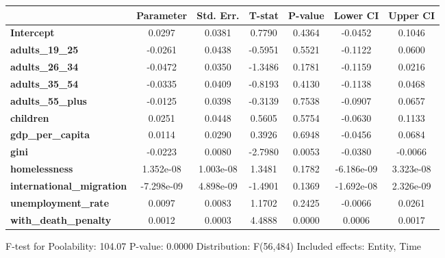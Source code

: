\begin{center}
\begin{tabular}{lclc}
\bottomrule
\end{tabular}
\begin{tabular}{lcccccc}
                                  & \textbf{Parameter} & \textbf{Std. Err.} & \textbf{T-stat} & \textbf{P-value} & \textbf{Lower CI} & \textbf{Upper CI}  \\
\midrule
\textbf{Intercept}                &       0.0297       &       0.0381       &      0.7790     &      0.4364      &      -0.0452      &       0.1046       \\
\textbf{adults\_19\_25}           &      -0.0261       &       0.0438       &     -0.5951     &      0.5521      &      -0.1122      &       0.0600       \\
\textbf{adults\_26\_34}           &      -0.0472       &       0.0350       &     -1.3486     &      0.1781      &      -0.1159      &       0.0216       \\
\textbf{adults\_35\_54}           &      -0.0335       &       0.0409       &     -0.8193     &      0.4130      &      -0.1138      &       0.0468       \\
\textbf{adults\_55\_plus}         &      -0.0125       &       0.0398       &     -0.3139     &      0.7538      &      -0.0907      &       0.0657       \\
\textbf{children}                 &       0.0251       &       0.0448       &      0.5605     &      0.5754      &      -0.0630      &       0.1133       \\
\textbf{gdp\_per\_capita}         &       0.0114       &       0.0290       &      0.3926     &      0.6948      &      -0.0456      &       0.0684       \\
\textbf{gini}                     &      -0.0223       &       0.0080       &     -2.7980     &      0.0053      &      -0.0380      &      -0.0066       \\
\textbf{homelessness}             &     1.352e-08      &     1.003e-08      &      1.3481     &      0.1782      &     -6.186e-09    &     3.323e-08      \\
\textbf{international\_migration} &     -7.298e-09     &     4.898e-09      &     -1.4901     &      0.1369      &     -1.692e-08    &     2.326e-09      \\
\textbf{unemployment\_rate}       &       0.0097       &       0.0083       &      1.1702     &      0.2425      &      -0.0066      &       0.0261       \\
\textbf{with\_death\_penalty}     &       0.0012       &       0.0003       &      4.4888     &      0.0000      &       0.0006      &       0.0017       \\
\bottomrule
\end{tabular}
\end{center}

F-test for Poolability: 104.07 \newline
 P-value: 0.0000 \newline
 Distribution: F(56,484) \newline
  \newline
 Included effects: Entity, Time